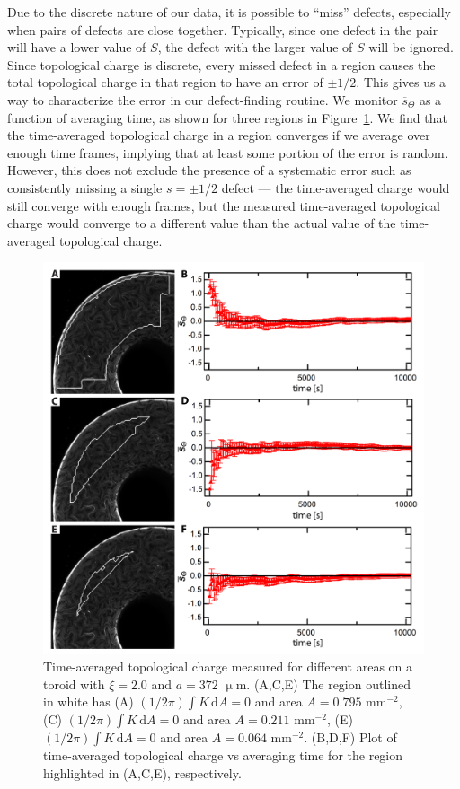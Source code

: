 Due to the discrete nature of our data, it is possible to ``miss'' defects, especially when pairs of defects are close together.
Typically, since one defect in the pair will have a lower value of $S$, the defect with the larger value of $S$ will be ignored.
Since topological charge is discrete, every missed defect in a region causes the total topological charge in that region to have an error of $\pm 1/2$.
This gives us a way to characterize the error in our defect-finding routine.
We monitor $\overbar{s}_{\Theta}$ as a function of averaging time, as shown for three regions in Figure~\ref{f:3-ChargeOverTime}.
We find that the time-averaged topological charge in a region converges if we average over enough time frames, implying that at least some portion of the error is random.
However, this does not exclude the presence of a systematic error such as consistently missing a single $s = \pm 1/2$ defect --- the time-averaged charge would still converge with enough frames, but the measured time-averaged topological charge would converge to a different value than the actual value of the time-averaged topological charge.
\begin{figure}
  \centering
  \includegraphics{figures/C3/Ch3-Figs_ChargeOverTime.png}
  \caption{Time-averaged topological charge measured for different areas on a toroid with $\xi = 2.0$ and $a = 372$ $\upmu$m.
  (A,C,E) The region outlined in white has (A) $(1/2 \pi) \int K \, \textrm{d}A = 0$ and area $A = 0.795$ mm$^{-2}$, (C) $(1/2 \pi) \int K \, \textrm{d}A = 0$ and area $A = 0.211$ mm$^{-2}$, (E) $(1/2 \pi) \int K \, \textrm{d}A = 0$ and area $A = 0.064$ mm$^{-2}$.
  (B,D,F) Plot of time-averaged topological charge vs averaging time for the region highlighted in (A,C,E), respectively.}\label{f:3-ChargeOverTime}
\end{figure}

